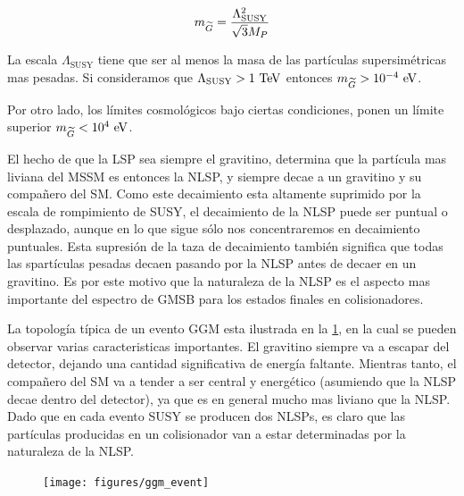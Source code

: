 \begin{equation}
  m_{\widetilde{G}} = \frac{\Lambda^2_{\text{SUSY}}}{\sqrt{3}M_P}
\end{equation}

La escala $\Lambda_{\text{SUSY}}$ tiene que ser al menos la masa de las
partículas supersimétricas mas pesadas. Si consideramos que
$\Lambda_{\text{SUSY}} > 1 \tev$ entonces $m_{\gravino} > 10^{-4} \eV$.

Por otro lado, los límites cosmológicos \cite{PhysRevLett.48.223,Moroi:1993mb}
bajo ciertas condiciones, ponen un límite superior $m_{\gravino} < 10^4 \eV$.%

El hecho de que la LSP sea siempre el gravitino, determina que la partícula mas
liviana del MSSM es entonces la NLSP, y siempre decae a un gravitino y su
compañero del SM. Como este decaimiento esta altamente suprimido por la escala
de rompimiento de SUSY, el decaimiento de la NLSP puede ser puntual o
desplazado, aunque en lo que sigue sólo nos concentraremos en decaimiento
puntuales. Esta supresión de la taza de decaimiento también significa que todas las
spartículas pesadas decaen pasando por la NLSP antes de decaer en un gravitino.
Es por este motivo que la naturaleza de la NLSP es el aspecto mas importante del
espectro de GMSB para los estados finales en colisionadores.


La topología típica de un evento GGM esta ilustrada en la
\cref{fig:ggm_event}, en la cual se pueden observar varias caracteristicas
importantes. El gravitino siempre va a escapar del detector, dejando una
cantidad significativa de energía faltante. Mientras tanto, el compañero del SM
va a tender a ser central y energético (asumiendo que la NLSP decae dentro del
detector), ya que es en general mucho mas liviano que la NLSP. Dado que en cada
evento SUSY se producen dos NLSPs, es claro que las partículas producidas en un
colisionador van a estar determinadas por la naturaleza de la NLSP.

\begin{figure}[!htbp]
  \centering
  \texttt{[image: figures/ggm\_event]}
  \caption{}
  \label{fig:ggm_event}
\end{figure}




